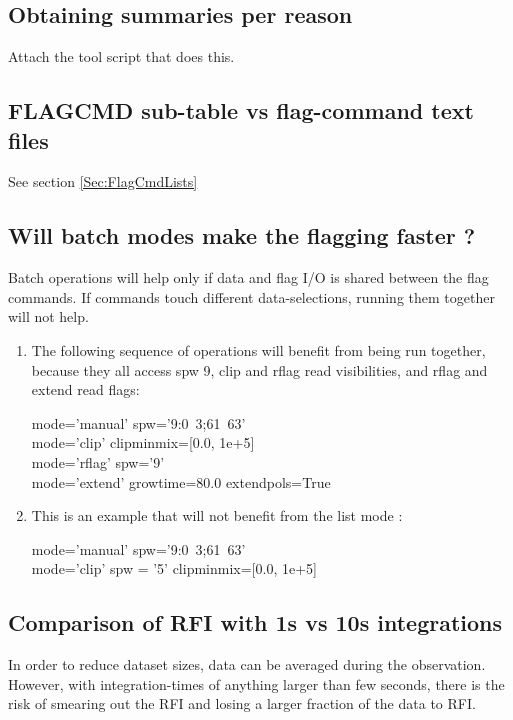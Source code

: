 \subsection{Obtaining summaries per reason}
Attach the tool script that does this.

\subsection{FLAGCMD sub-table vs flag-command text files}
See section \ref{Sec:FlagCmdLists}


\subsection{Will batch modes make the flagging faster ?}

Batch operations will help only if data and flag I/O is shared between the flag commands.  
If commands touch different data-selections, running them together will not help.

\begin{enumerate}
\item The following sequence of operations will benefit from being run together, 
because they all access spw 9, clip and rflag read visibilities, and rflag and extend read flags:

mode='manual'  spw='9:0~3;61~63' \\
mode='clip'  clipminmix=[0.0, 1e+5] \\
mode='rflag'   spw='9' \\
mode='extend'  growtime=80.0   extendpols=True 

\item This is an example that will not benefit from the list mode : 

mode='manual'  spw='9:0~3;61~63' \\
mode='clip'  spw = '5'  clipminmix=[0.0, 1e+5] 

\end{enumerate}




\subsection{Comparison of RFI with 1s vs 10s integrations}
In order to reduce dataset sizes, data can be averaged during the observation. However, with integration-times of anything larger than few seconds, there is the risk of smearing out the RFI and losing a larger fraction of the data to RFI.   

